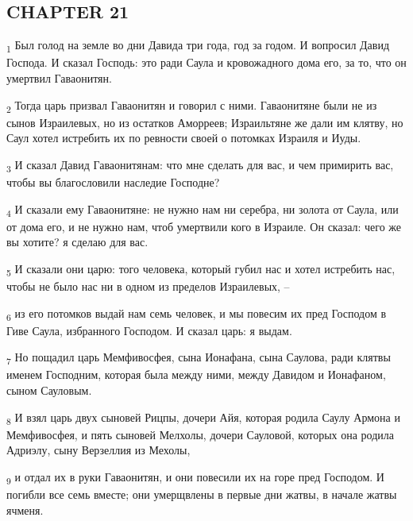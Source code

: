 \subsection{CHAPTER 21}
\begin{tcolorbox}
\textsubscript{1} Был голод на земле во дни Давида три года, год за годом. И вопросил Давид Господа. И сказал Господь: это ради Саула и кровожадного дома его, за то, что он умертвил Гаваонитян.
\end{tcolorbox}
\begin{tcolorbox}
\textsubscript{2} Тогда царь призвал Гаваонитян и говорил с ними. Гаваонитяне были не из сынов Израилевых, но из остатков Аморреев; Израильтяне же дали им клятву, но Саул хотел истребить их по ревности своей о потомках Израиля и Иуды.
\end{tcolorbox}
\begin{tcolorbox}
\textsubscript{3} И сказал Давид Гаваонитянам: что мне сделать для вас, и чем примирить вас, чтобы вы благословили наследие Господне?
\end{tcolorbox}
\begin{tcolorbox}
\textsubscript{4} И сказали ему Гаваонитяне: не нужно нам ни серебра, ни золота от Саула, или от дома его, и не нужно нам, чтоб умертвили кого в Израиле. Он сказал: чего же вы хотите? я сделаю для вас.
\end{tcolorbox}
\begin{tcolorbox}
\textsubscript{5} И сказали они царю: того человека, который губил нас и хотел истребить нас, чтобы не было нас ни в одном из пределов Израилевых, --
\end{tcolorbox}
\begin{tcolorbox}
\textsubscript{6} из его потомков выдай нам семь человек, и мы повесим их пред Господом в Гиве Саула, избранного Господом. И сказал царь: я выдам.
\end{tcolorbox}
\begin{tcolorbox}
\textsubscript{7} Но пощадил царь Мемфивосфея, сына Ионафана, сына Саулова, ради клятвы именем Господним, которая была между ними, между Давидом и Ионафаном, сыном Сауловым.
\end{tcolorbox}
\begin{tcolorbox}
\textsubscript{8} И взял царь двух сыновей Рицпы, дочери Айя, которая родила Саулу Армона и Мемфивосфея, и пять сыновей Мелхолы, дочери Сауловой, которых она родила Адриэлу, сыну Верзеллия из Мехолы,
\end{tcolorbox}
\begin{tcolorbox}
\textsubscript{9} и отдал их в руки Гаваонитян, и они повесили их на горе пред Господом. И погибли все семь вместе; они умерщвлены в первые дни жатвы, в начале жатвы ячменя.
\end{tcolorbox}
